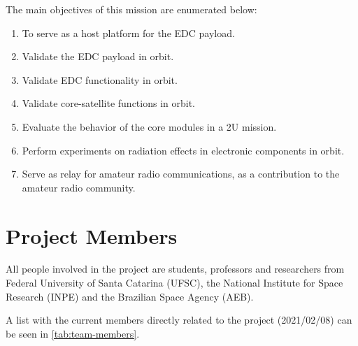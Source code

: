 The main objectives of this mission are enumerated below:

\begin{enumerate}
    \item To serve as a host platform for the EDC payload.
    \item Validate the EDC payload in orbit.
    \item Validate EDC functionality in orbit.
    \item Validate core-satellite functions in orbit.
    \item Evaluate the behavior of the core modules in a 2U mission.
    \item Perform experiments on radiation effects in electronic components in orbit.
    \item Serve as relay for amateur radio communications, as a contribution to the amateur radio community.
\end{enumerate}

\section{Project Members}

All people involved in the project are students, professors and researchers from Federal University of Santa Catarina (UFSC), the National Institute for Space Research (INPE) and the Brazilian Space Agency (AEB).

A list with the current members directly related to the project (2021/02/08) can be seen in \autoref{tab:team-members}.

